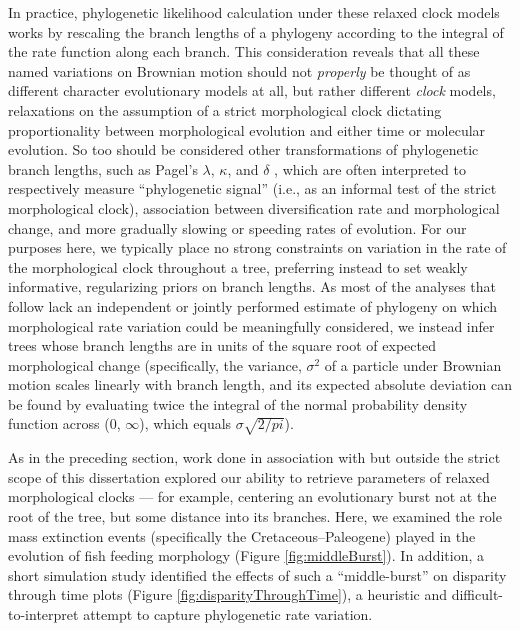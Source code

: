 In practice, phylogenetic likelihood calculation under these relaxed clock models works by rescaling the branch lengths of a phylogeny according to the integral of the rate function along each branch. This consideration reveals that all these named variations on Brownian motion should not \textit{properly} be thought of as different character evolutionary models at all, but rather different \textit{clock} models, relaxations on the assumption of a strict morphological clock dictating proportionality between morphological evolution and either time or molecular evolution. So too should be considered other transformations of phylogenetic branch lengths, such as Pagel's $\lambda$, $\kappa$, and $\delta$ \citep{pagelMaximumLikelihoodApproach1999, pagelInferringHistoricalPatterns1999}, which are often interpreted to respectively measure ``phylogenetic signal'' (i.e., as an informal test of the strict morphological clock), association between diversification rate and morphological change, and more gradually slowing or speeding rates of evolution. For our purposes here, we typically place no strong constraints on variation in the rate of the morphological clock throughout a tree, preferring instead to set weakly informative, regularizing priors on branch lengths. As most of the analyses that follow lack an independent or jointly performed estimate of phylogeny on which morphological rate variation could be meaningfully considered, we instead infer trees whose branch lengths are in units of the square root of expected morphological change (specifically, the variance, $\sigma^2$ of a particle under Brownian motion scales linearly with branch length, and its expected absolute deviation can be found by evaluating twice the integral of the normal probability density function across (0, $\infty$), which equals $\sigma \sqrt{2 / pi}$). 

As in the preceding section, work done in association with but outside the strict scope of this dissertation explored our ability to retrieve parameters of relaxed morphological clocks --- for example, centering an evolutionary burst not at the root of the tree, but some distance into its branches. Here, we examined the role mass extinction events (specifically the Cretaceous–Paleogene) played in the evolution of fish feeding morphology (Figure \ref{fig:middleBurst}). In addition, a short simulation study identified the effects of such a ``middle-burst'' on disparity through time \citep{harmonTempoModeEvolutionary2003} plots (Figure \ref{fig:disparityThroughTime}), a heuristic and difficult-to-interpret attempt to capture phylogenetic rate variation.
 
